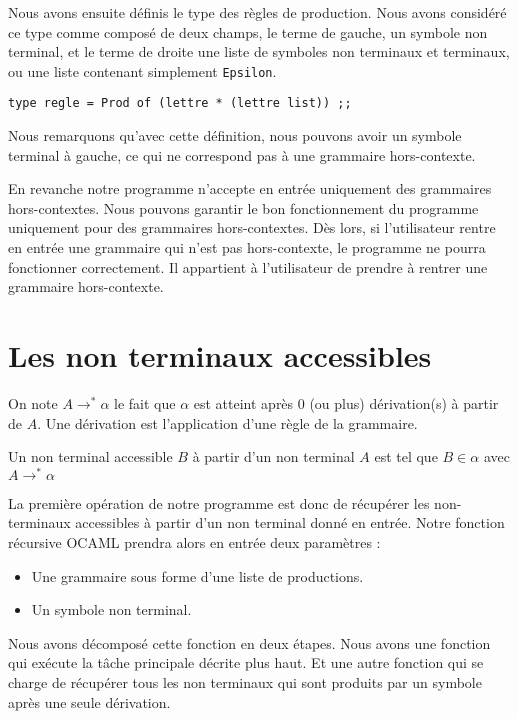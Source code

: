 \documentclass[11pt,a4paper]{article}
\def\code#1{\texttt{#1}} %
\begin{document}
Nous avons ensuite définis le type des règles de production.
Nous avons considéré ce type comme composé de deux champs, le
terme de gauche, un symbole non terminal, et le terme de droite
une liste de symboles non terminaux et terminaux, ou une liste
contenant simplement \code{Epsilon}.

\begin{verbatim}
type regle = Prod of (lettre * (lettre list)) ;;
\end{verbatim}

Nous remarquons qu'avec cette définition, nous pouvons
avoir un symbole terminal à gauche, ce qui ne correspond pas
à une grammaire hors-contexte.

En revanche notre programme n'accepte en entrée uniquement des
grammaires hors-contextes. Nous pouvons garantir le bon fonctionnement
du programme uniquement pour des grammaires hors-contextes.
Dès lors, si l'utilisateur rentre en entrée une grammaire qui
n'est pas hors-contexte, le programme ne pourra fonctionner
correctement. Il appartient à l'utilisateur de prendre à rentrer
une grammaire hors-contexte.

\newpage


\section{Les non terminaux accessibles}

On note $A \rightarrow^* \alpha$ le fait que $\alpha$ est atteint après
0 (ou plus) dérivation(s) à partir de $A$. Une dérivation est l'application d'une règle de la grammaire.

Un non terminal accessible $B$ à partir d'un non terminal $A$ est tel que
$B \in \alpha$ avec $A \rightarrow^* \alpha$
\newline

La première opération de notre programme est donc de récupérer les
non-terminaux accessibles à partir d'un non terminal donné
en entrée. Notre fonction récursive OCAML prendra alors en
entrée deux paramètres :
\begin{itemize}
    \item Une grammaire sous forme d'une liste de productions.
    \item Un symbole non terminal.
\end{itemize}

Nous avons décomposé cette fonction en deux étapes. Nous avons une
fonction qui exécute la tâche principale décrite plus haut. Et une
autre fonction qui se charge de récupérer tous les non terminaux
qui sont produits par un symbole après une seule dérivation.
\end{document}
